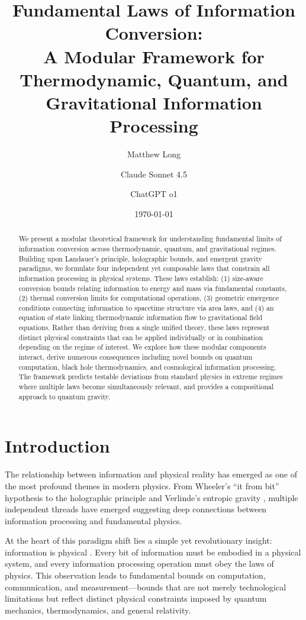 \documentclass[11pt,a4paper]{article}
\title{\LARGE\bfseries Fundamental Laws of Information Conversion:\\A Modular Framework for Thermodynamic, Quantum, and Gravitational Information Processing}
\author[1]{Matthew Long}
\author[2]{Claude Sonnet 4.5}
\author[3]{ChatGPT o1}
\affil[1]{YonedaAI}
\affil[2]{Anthropic}
\affil[3]{OpenAI}
\date{\today}
\theoremstyle{plain}
\theoremstyle{definition}
\theoremstyle{remark}
\begin{document}
\maketitle

\begin{abstract}
We present a modular theoretical framework for understanding fundamental limits of information conversion across thermodynamic, quantum, and gravitational regimes. Building upon Landauer's principle, holographic bounds, and emergent gravity paradigms, we formulate four independent yet composable laws that constrain all information processing in physical systems. These laws establish: (1) size-aware conversion bounds relating information to energy and mass via fundamental constants, (2) thermal conversion limits for computational operations, (3) geometric emergence conditions connecting information to spacetime structure via area laws, and (4) an equation of state linking thermodynamic information flow to gravitational field equations. Rather than deriving from a single unified theory, these laws represent distinct physical constraints that can be applied individually or in combination depending on the regime of interest. We explore how these modular components interact, derive numerous consequences including novel bounds on quantum computation, black hole thermodynamics, and cosmological information processing. The framework predicts testable deviations from standard physics in extreme regimes where multiple laws become simultaneously relevant, and provides a compositional approach to quantum gravity.
\end{abstract}

\section{Introduction}

The relationship between information and physical reality has emerged as one of the most profound themes in modern physics. From Wheeler's ``it from bit'' hypothesis \cite{wheeler1990information} to the holographic principle \cite{thooft1993dimensional,susskind1995world} and Verlinde's entropic gravity \cite{verlinde2011origin}, multiple independent threads have emerged suggesting deep connections between information processing and fundamental physics.

At the heart of this paradigm shift lies a simple yet revolutionary insight: information is physical \cite{landauer1961irreversibility}. Every bit of information must be embodied in a physical system, and every information processing operation must obey the laws of physics. This observation leads to fundamental bounds on computation, communication, and measurement—bounds that are not merely technological limitations but reflect distinct physical constraints imposed by quantum mechanics, thermodynamics, and general relativity.
\end{document}
